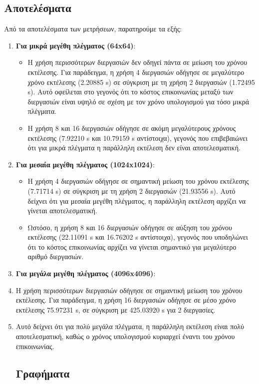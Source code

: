 \documentclass{article}
\begin{document}
\begin{enumerate}
\subsection*{Αποτελέσματα}
Από τα αποτελέσματα των μετρήσεων, παρατηρούμε τα εξής:
\begin{enumerate}
    \item \textbf{Για μικρά μεγέθη πλέγματος (64x64)}:
    \begin{itemize}
        \item Η χρήση περισσότερων διεργασιών δεν οδηγεί πάντα σε μείωση του χρόνου εκτέλεσης. Για παράδειγμα, η χρήση 4 διεργασιών οδήγησε σε μεγαλύτερο χρόνο εκτέλεσης (2.20885 s) σε σύγκριση με τη χρήση 2 διεργασιών (1.72495 s). Αυτό οφείλεται στο γεγονός ότι το κόστος επικοινωνίας μεταξύ των διεργασιών είναι υψηλό σε σχέση με τον χρόνο υπολογισμού για τόσο μικρά πλέγματα.
        \item Η χρήση 8 και 16 διεργασιών οδήγησε σε ακόμη μεγαλύτερους χρόνους εκτέλεσης (7.92210 s και 10.79159 s αντίστοιχα), γεγονός που επιβεβαιώνει ότι για μικρά πλέγματα η παράλληλη εκτέλεση δεν είναι αποτελεσματική.
    \end{itemize}
    \item \textbf{Για μεσαία μεγέθη πλέγματος (1024x1024)}:
    \begin{itemize}
        \item Η χρήση 4 διεργασιών οδήγησε σε σημαντική μείωση του χρόνου εκτέλεσης (7.71714 s) σε σύγκριση με τη χρήση 2 διεργασιών (21.93556 s). Αυτό δείχνει ότι για μεσαία μεγέθη πλέγματος, η παράλληλη εκτέλεση αρχίζει να γίνεται αποτελεσματική.
        \item Ωστόσο, η χρήση 8 και 16 διεργασιών οδήγησε σε αύξηση του χρόνου εκτέλεσης (22.11091 s και 16.76202 s αντίστοιχα), γεγονός που υποδηλώνει ότι το κόστος επικοινωνίας αρχίζει να γίνεται σημαντικό για μεγαλύτερο αριθμό διεργασιών.
    \end{itemize}
    \item \textbf{Για μεγάλα μεγέθη πλέγματος (4096x4096)}:
    \item Η χρήση περισσότερων διεργασιών οδήγησε σε σημαντική μείωση του χρόνου εκτέλεσης. Για παράδειγμα, η χρήση 16 διεργασιών οδήγησε σε μέσο χρόνο εκτέλεσης 75.97231 s, σε σύγκριση με 425.03920 s για 2 διεργασίες.
    \item Αυτό δείχνει ότι για πολύ μεγάλα πλέγματα, η παράλληλη εκτέλεση είναι πολύ αποτελεσματική, καθώς ο χρόνος υπολογισμού κυριαρχεί έναντι του χρόνου επικοινωνίας.
\subsection*{Γραφήματα}

\end{enumerate}
\end{enumerate}
\end{document}
